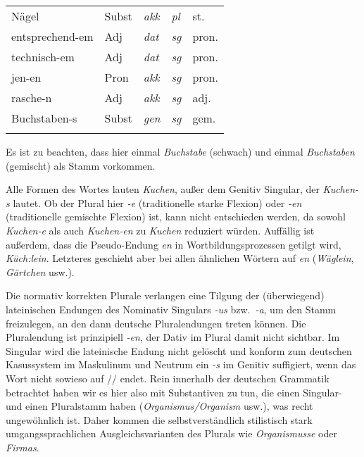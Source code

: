 \begin{center}
\begin{tabular}{lllll}
    Nägel & Subst & \textit{akk} & \textit{pl} & st. \\
    entsprechend-em & Adj & \textit{dat} & \textit{sg} & pron. \\
    technisch-em & Adj & \textit{dat} & \textit{sg} & pron. \\
    jen-en & Pron & \textit{akk} & \textit{sg} & pron. \\
    rasche-n & Adj & \textit{akk} & \textit{sg} & adj. \\
    Buchstaben-s & Subst & \textit{gen} & \textit{sg} & gem. \\
    \lspbottomrule
  \end{tabular}
\end{center}

Es ist zu beachten, dass hier einmal \textit{Buchstabe} (schwach) und einmal \textit{Buchstaben} (gemischt) als Stamm vorkommen.


\begin{sloppypar}
Alle Formen des Wortes lauten \textit{Kuchen}, außer dem Genitiv Singular, der \textit{Kuchen-s} lautet.
Ob der Plural hier \textit{-e} (traditionelle starke Flexion) oder \textit{-en} (traditionelle gemischte Flexion) ist, kann nicht entschieden werden, da sowohl \textit{\Ast Kuchen-e} als auch \textit{\Ast Kuchen-en} zu \textit{Kuchen} reduziert würden.
Auffällig ist außerdem, dass die Pseudo-Endung \textit{en} in Wortbildungsprozessen getilgt wird, \zB \textit{Küch:}\textit{lein}.
Letzteres geschieht aber bei allen ähnlichen Wörtern auf \textit{en} (\textit{Wäglein}, \textit{Gärtchen} usw.).
\end{sloppypar}


Die normativ korrekten Plurale verlangen eine Tilgung der (überwiegend) lateinischen Endungen des Nominativ Singulars \textit{-us} bzw.\ \textit{-a}, um den Stamm freizulegen, an den dann deutsche Pluralendungen treten können.
Die Pluralendung ist prinzipiell \textit{-en}, der Dativ im Plural damit nicht sichtbar.
Im Singular wird die lateinische Endung nicht gelöscht und konform zum deutschen Kasussystem im Maskulinum und Neutrum ein \textit{-s} im Genitiv suffigiert, wenn das Wort nicht sowieso auf // endet.
Rein innerhalb der deutschen Grammatik betrachtet haben wir es hier also mit Substantiven zu tun, die einen Singular- und einen Pluralstamm haben (\textit{Organismus\slash Organism} usw.), was recht ungewöhnlich ist.
Daher kommen die selbstverständlich stilistisch stark umgangssprachlichen Ausgleichsvarianten des Plurals wie \textit{Organismusse} oder \textit{Firmas}.

